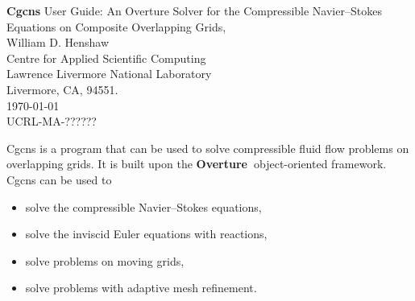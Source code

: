 \documentclass{article}
\newcommand{\Overture}{{\bf Overture\ }}
\begin{document}


\def\ud     {{    U}}
\def\pd     {{    P}}

\newcommand{\mbar}{\bar{m}}
\newcommand{\Rbar}{\bar{R}}
\newcommand{\Ru}{R_u}         %
\newcommand{\Div}{\grad\cdot}
\newcommand{\tauv}{\boldsymbol{\tau}}
\newcommand{\sumi}{\sum_{i=1}^n}
\newcommand{\dt}{{\Delta t}}

\baselineskip
\begin{flushleft}
{\Large
{\bf Cgcns} User Guide: An Overture Solver for the Compressible Navier--Stokes Equations on Composite Overlapping Grids,\\
}
\vspace{2\baselineskip}
William D. Henshaw  \\
Centre for Applied Scientific Computing  \\
Lawrence Livermore National Laboratory      \\
Livermore, CA, 94551.  \\
\vspace{\baselineskip}
\today\\
\vspace{\baselineskip}
UCRL-MA-??????

\vspace{4\baselineskip}


   Cgcns is a program that can be used to solve compressible fluid flow problems on overlapping
grids. It is built upon the \Overture object-oriented framework. 
Cgcns can be used to 
\begin{itemize}
  \item solve the compressible Navier--Stokes equations,
  \item solve the inviscid Euler equations with reactions, 
  \item solve problems on moving grids, 
  \item solve problems with adaptive mesh refinement.
\end{itemize} 

\end{flushleft}

\clearpage
\tableofcontents

\clearpage
\end{document}
